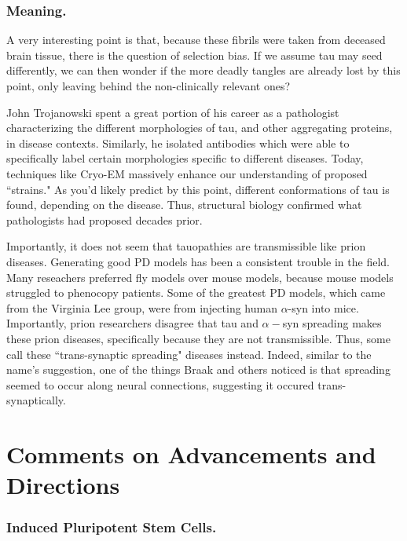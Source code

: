 \subsubsection*{Meaning.}

A very interesting point is that, because these fibrils were taken from deceased brain tissue, there is the question of selection bias. If we assume tau may seed differently, we can then wonder if the more deadly tangles are already lost by this point, only leaving behind the non-clinically relevant ones?\newline

John Trojanowski spent a great portion of his career as a pathologist characterizing the different morphologies of tau, and other aggregating proteins, in disease contexts. Similarly, he isolated antibodies which were able to specifically label certain morphologies specific to different diseases. Today, techniques like Cryo-EM massively enhance our understanding of proposed ``strains." As you'd likely predict by this point, different conformations of tau is found, depending on the disease. Thus, structural biology confirmed what pathologists had proposed decades prior.\newline

Importantly, it does not seem that tauopathies are transmissible like prion diseases. Generating good PD models has been a consistent trouble in the field. Many reseachers preferred fly models over mouse models, because mouse models struggled to phenocopy patients. Some of the greatest PD models, which came from the Virginia Lee group, were from injecting human $\alpha$-syn into mice. Importantly, prion researchers disagree that tau and $\alpha-$syn spreading makes these prion diseases, specifically because they are not transmissible. Thus, some call these ``trans-synaptic spreading" diseases instead. Indeed, similar to the name's suggestion, one of the things Braak and others noticed is that spreading seemed to occur along neural connections, suggesting it occured trans-synaptically.  


\section*{Comments on Advancements and Directions}

\subsubsection*{Induced Pluripotent Stem Cells.}

